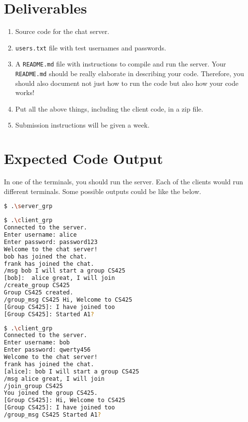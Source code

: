 \documentclass[12pt,a4paper]{article}
\begin{document}
\section*{Deliverables}
\begin{enumerate}
    \item Source code for the chat server.
    \item \texttt{users.txt} file with test usernames and passwords.
    \item A \texttt{README.md} file with instructions to compile and run the server. Your \texttt{README.md} should be really elaborate in describing your code. Therefore, you should also document not just how to run the code but also how your code works!
    \item Put all the above things, including the client code, in a zip file.
    \item Submission instructions will be given a week. 
\end{enumerate}

\section*{Expected Code Output}
In one of the terminals, you should run the server.  Each of the clients would run different terminals. Some possible outputs could be like the below.


\begin{lstlisting}[language=bash, caption={Running the server executable in one Terminal}]
$ .\server_grp
\end{lstlisting}


\begin{lstlisting}[language=bash, caption={Running one of the clients in the second Terminal}]
$ .\client_grp
Connected to the server.
Enter username: alice
Enter password: password123
Welcome to the chat server!
bob has joined the chat.
frank has joined the chat.
/msg bob I will start a group CS425
[bob]:  alice great, I will join
/create_group CS425
Group CS425 created.
/group_msg CS425 Hi, Welcome to CS425
[Group CS425]: I have joined too
[Group CS425]: Started A1?
\end{lstlisting}

\begin{lstlisting}[language=bash, caption={Running another client in the third Terminal}]
$ .\client_grp
Connected to the server.
Enter username: bob
Enter password: qwerty456
Welcome to the chat server!
frank has joined the chat.
[alice]: bob I will start a group CS425
/msg alice great, I will join                           
/join_group CS425
You joined the group CS425.
[Group CS425]: Hi, Welcome to CS425
[Group CS425]: I have joined too
/group_msg CS425 Started A1?
\end{lstlisting}
\end{document}
